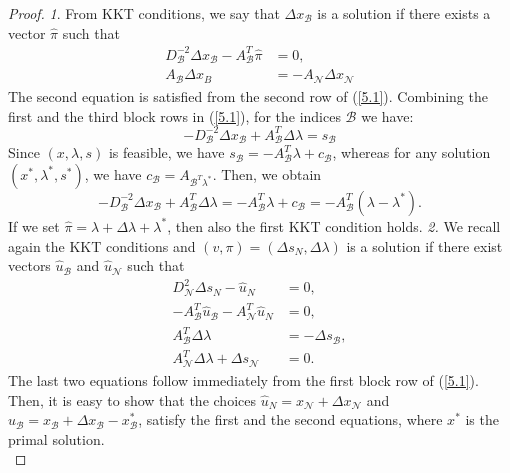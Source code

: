 \documentclass[a4paper,10 pt,titlepage,twoside]{book}
\theoremstyle{plain}
\theoremstyle{definition}
\theoremstyle{remark}
\begin{document}
\begin{proof}
	\textit{1}. From KKT conditions, we say that $\Delta x_{\mathcal{B}}$ is a solution if there exists a vector $\hat{\pi}$ such that
	\begin{align*}
	D_{\mathcal{B}}^{-2}\Delta x_{\mathcal{B}}-A_{\mathcal{B}}^{T}\hat{\pi}&= 0,\\
	A_{\mathcal{B}}\Delta x_{B}&= -A_{\mathcal{N}}\Delta x_{\mathcal{N}}
	\end{align*}
	The second equation is satisfied from the second row of (\ref{5.1}). Combining the first and the third block rows in (\ref{5.1}), for the indices $\mathcal{B}$ we have:
	\begin{equation*}
	-D_{\mathcal{B}}^{-2}\Delta x_{\mathcal{B}} + A_{\mathcal{B}}^{T}\Delta \lambda = s_{\mathcal{B}}
	\end{equation*}
	Since $(x, \lambda, s)$ is feasible, we have $s_{\mathcal{B}}= -A_{\mathcal{B}}^{T}\lambda+ c_{\mathcal{B}}$, whereas for any solution $(x^{*}, \lambda^{*}, s^{*})$, we have $c_{\mathcal{B}}= A_{\mathcal{B}^{T}\lambda^{*}}$. Then, we obtain
	\begin{equation*}
	-D_{\mathcal{B}}^{-2}\Delta x_{\mathcal{B}} + A_{\mathcal{B}}^{T}\Delta \lambda = -A_{\mathcal{B}}^{T}\lambda+ c_{\mathcal{B}} = -A_{\mathcal{B}}^{T}(\lambda - \lambda^{*}). 
	\end{equation*}
	If we set $\hat{\pi} = \lambda + \Delta\lambda + \lambda^{*}$, then also the first KKT condition holds.\newline
	\textit{2.} We recall again the KKT conditions and $(v,\pi)=(\Delta s_{N},\Delta\lambda)$ is a solution if there exist vectors $\hat{u}_{\mathcal{B}}$ and $\hat{u}_{\mathcal{N}}$ such that
	\begin{align*}
	D_{\mathcal{N}}^{2}\Delta s_{N}-\hat{u}_{N}&=0,\\
	-A_{\mathcal{B}}^{T}\hat{u}_{\mathcal{B}}-A_{\mathcal{N}}^{T}\hat{u}_{N}&=0,\\
	A_{\mathcal{B}}^{T}\Delta \lambda &= -\Delta s_{\mathcal{B}},\\
	A_{\mathcal{N}}^{T}\Delta\lambda + \Delta s_{\mathcal{N}} &=0. 
	\end{align*}
	The last two equations follow immediately from the first block row of (\ref{5.1}).\\
	Then, it is easy to show that the choices $\hat{u}_{N}= x_{\mathcal{N}}+\Delta x_{\mathcal{N}}$ and $\hat{u}_{\mathcal{B}}=x_{\mathcal{B}}+\Delta x_{\mathcal{B}}-x_{\mathcal{B}}^{*}$, satisfy the first and the second equations, where $x^{*}$ is the primal solution.\\

\end{proof}
\end{document}
